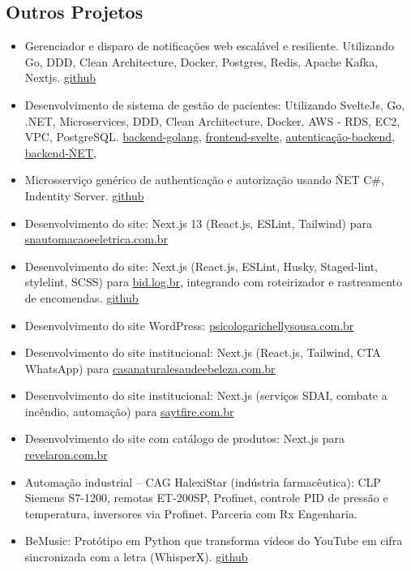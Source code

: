 \documentclass[11pt,a4paper,sans]{moderncv}
\begin{document}
\begin{samepage}
	\section{Outros Projetos}
	\begin{itemize}[itemsep=0cm, leftmargin=0.6cm, label={\textbullet}]
		\item Gerenciador e disparo de notificações web escalável e resiliente. Utilizando Go, DDD, Clean Architecture, Docker, Postgres, Redis, Apache Kafka, Nextjs. {\color{blue}\href{https://github.com/beriloqueiroz/desafio-dev}{github}}
		\item Desenvolvimento de sistema de gestão de pacientes: Utilizando SvelteJs, Go, .NET, Microservices, DDD, Clean Architecture, Docker, AWS - RDS, EC2, VPC, PostgreSQL.
			      {\color{blue}\href{https://github.com/beriloqueiroz/prontu-go}{backend-golang}}, {\color{blue}\href{https://github.com/beriloqueiroz/prontu-front}{frontend-svelte}}, {\color{blue}\href{https://github.com/beriloqueiroz/auth-prontu}{autenticação-backend}}, {\color{blue}\href{https://github.com/beriloqueiroz/prontu}{backend-\.NET}},
		\item Microsserviço genérico de authenticação e autorização usando \.NET C\#, Indentity Server. {\color{blue}\href{https://github.com/beriloqueiroz/auth-user}{github}}
		\item Desenvolvimento do site: Next.js 13 (React.js, ESLint, Tailwind) para {\color{blue}\href{https://snautomacaoeeletrica.com.br}{snautomacaoeeletrica.com.br}}
		\item Desenvolvimento do site: Next.js (React.js, ESLint, Husky, Staged-lint, stylelint, SCSS) para \underline{bid.log.br}, integrando com roteirizador e rastreamento de encomendas. {\color{blue}\href{https://github.com/beriloqueiroz/bid-site}{github}}
		\item Desenvolvimento do site WordPress: {\color{blue}\href{psicologarichellysousa.com.br}{psicologarichellysousa.com.br}}
		\item Desenvolvimento do site institucional: Next.js (React.js, Tailwind, CTA WhatsApp) para {\color{blue}\href{https://casanaturalesaudeebeleza.com.br}{casanaturalesaudeebeleza.com.br}}
		\item Desenvolvimento do site institucional: Next.js (serviços SDAI, combate a incêndio, automação) para {\color{blue}\href{https://saytfire.com.br}{saytfire.com.br}}
		\item Desenvolvimento do site com catálogo de produtos: Next.js para {\color{blue}\href{https://revelaron.com.br}{revelaron.com.br}}
		\item Automação industrial -- CAG HalexiStar (indústria farmacêutica): CLP Siemens S7-1200, remotas ET-200SP, Profinet, controle PID de pressão e temperatura, inversores via Profinet. Parceria com Rx Engenharia.
		\item BeMusic: Protótipo em Python que transforma vídeos do YouTube em cifra sincronizada com a letra (WhisperX). {\color{blue}\href{https://github.com/beriloqueiroz/bemusic}{github}}
	\end{itemize}
\end{samepage}
\vspace{\baselineskip}
\end{document}
